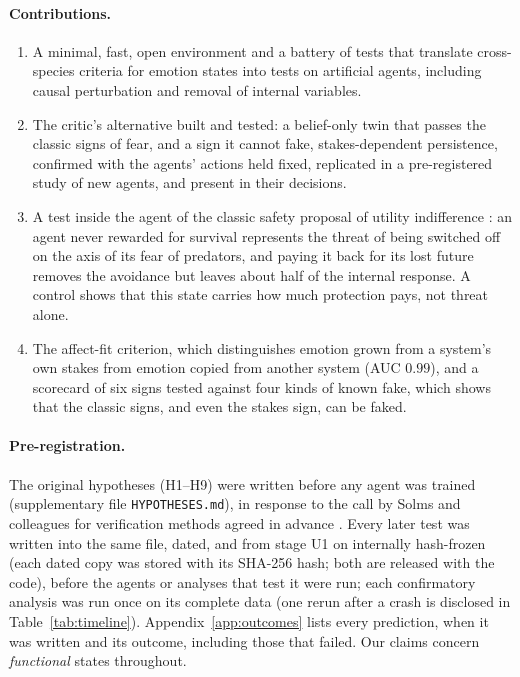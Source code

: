 \documentclass[11pt]{article}
\begin{document}
\paragraph{Contributions.}
\begin{enumerate}
\item A minimal, fast, open environment and a battery of tests that translate cross-species criteria for emotion states into tests on artificial agents, including causal perturbation and removal of internal variables.
\item The critic's alternative built and tested: a belief-only twin that passes the classic signs of fear, and a sign it cannot fake, stakes-dependent persistence, confirmed with the agents' actions held fixed, replicated in a pre-registered study of new agents, and present in their decisions.
\item A test inside the agent of the classic safety proposal of utility indifference \cite{soares2015corrigibility}: an agent never rewarded for survival represents the threat of being switched off on the axis of its fear of predators, and paying it back for its lost future removes the avoidance but leaves about half of the internal response. A control shows that this state carries how much protection pays, not threat alone.
\item The affect-fit criterion, which distinguishes emotion grown from a system's own stakes from emotion copied from another system (AUC $0.99$), and a scorecard of six signs tested against four kinds of known fake, which shows that the classic signs, and even the stakes sign, can be faked.
\end{enumerate}

\paragraph{Pre-registration.} The original hypotheses (H1--H9) were written before any agent was trained (supplementary file \texttt{HYPOTHESES.md}), in response to the call by Solms and colleagues for verification methods agreed in advance \cite{solms2026inferring}. Every later test was written into the same file, dated, and from stage U1 on internally hash-frozen (each dated copy was stored with its SHA-256 hash; both are released with the code), before the agents or analyses that test it were run; each confirmatory analysis was run once on its complete data (one rerun after a crash is disclosed in Table~\ref{tab:timeline}). Appendix~\ref{app:outcomes} lists every prediction, when it was written and its outcome, including those that failed. Our claims concern \emph{functional} states throughout.
\end{document}
